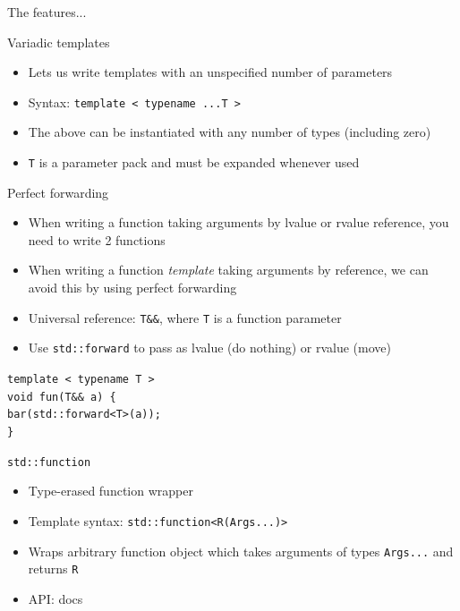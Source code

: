 \documentclass{beamer}
\begin{document}
\begin{frame}[standout]
The features...
\end{frame}

\begin{frame}{Variadic templates}
\begin{itemize}
\item Lets us write templates with an unspecified number of parameters
\item Syntax: \texttt{template < typename ...T >}
\item The above can be instantiated with any number of types (including zero)
\item \texttt{T} is a parameter pack and must be expanded whenever used
\end{itemize}
\end{frame}

\begin{frame}{Perfect forwarding}
\begin{itemize}
\item When writing a function taking arguments by lvalue or rvalue reference, you need to write 2 functions
\item When writing a function \textit{template} taking arguments by reference, we can avoid this by using perfect forwarding
\item Universal reference: \texttt{T\&\&}, where \texttt{T} is a function parameter
\item Use \texttt{std::forward} to pass as lvalue (do nothing) or rvalue (move)
\end{itemize}
\texttt{template < typename T >}\\
\texttt{void fun(T\&\& a) \{}\\
\hspace{0.5cm}\texttt{bar(std::forward<T>(a));}\\
\texttt{\}}
\end{frame}

\begin{frame}{\texttt{std::function}}
\begin{itemize}
\item Type-erased function wrapper
\item Template syntax: \texttt{std::function<R(Args...)>}
\item Wraps arbitrary function object which takes arguments of types \texttt{Args...} and returns \texttt{R}
\item API: docs
\end{itemize}
\end{frame}
\end{document}
